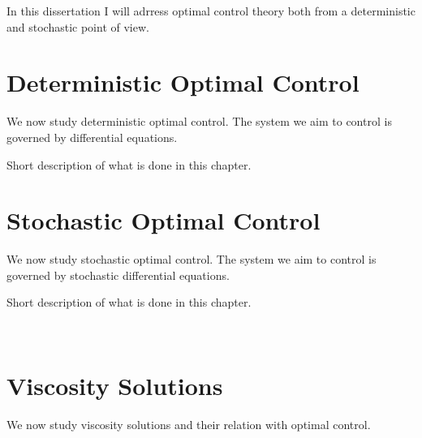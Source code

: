 \documentclass[12pt,a4paper]{book}
\numberwithin{theorem}{section}
\numberwithin{definition}{section}
\numberwithin{example}{section}
\numberwithin{exercise}{section}
\begin{document}
In this dissertation I will adrress optimal control theory both from a deterministic and stochastic point of view. 

\newpage

\chapter{Deterministic Optimal Control}

We now study deterministic optimal control. The system we aim to control is governed by differential equations. 

Short description of what is done in this chapter.













\newpage

\chapter{Stochastic Optimal Control}

We now study stochastic optimal control. The system we aim to control is governed by stochastic differential equations. 

Short description of what is done in this chapter.

\





\newpage

\chapter{Viscosity Solutions}

We now study viscosity solutions and their relation with optimal control.



\newpage

\nocite{*}
\printbibliography
{}

\end{document}
